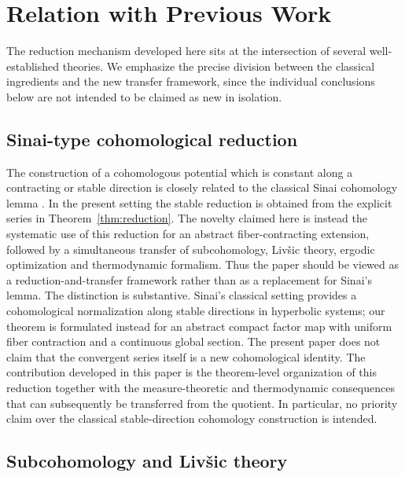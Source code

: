 \documentclass[11pt,a4paper]{article}
\begin{document}
\section{Relation with Previous Work}\label{sec:comparison}

The reduction mechanism developed here sits at the intersection of several
well-established theories. We emphasize the precise division between the
classical ingredients and the new transfer framework, since the individual
conclusions below are not intended to be claimed as new in isolation.

\subsection{Sinai-type cohomological reduction}

The construction of a cohomologous potential which is constant along a
contracting or stable direction is closely related to the classical Sinai
cohomology lemma \cite{Sinai}. In the present setting the stable reduction is
obtained from the explicit series in Theorem~\ref{thm:reduction}. The novelty
claimed here is instead the systematic use of this reduction for an abstract
fiber-contracting extension, followed by a simultaneous transfer of
subcohomology, Liv\v{s}ic theory, ergodic optimization and thermodynamic
formalism. Thus the paper should be viewed as a reduction-and-transfer
framework rather than as a replacement for Sinai's lemma.
The distinction is substantive. Sinai's classical setting provides a
cohomological normalization along stable directions in hyperbolic systems;
our theorem is formulated instead for an abstract compact factor map with
uniform fiber contraction and a continuous global section. The present paper
does not claim that the convergent series itself is a new cohomological
identity. The contribution developed in this paper is the theorem-level organization of
this reduction together with the measure-theoretic and thermodynamic
consequences that can subsequently be transferred from the quotient. In
particular, no priority claim over the classical stable-direction
cohomology construction is intended.


\subsection{Subcohomology and Liv\v{s}ic theory}
\end{document}
